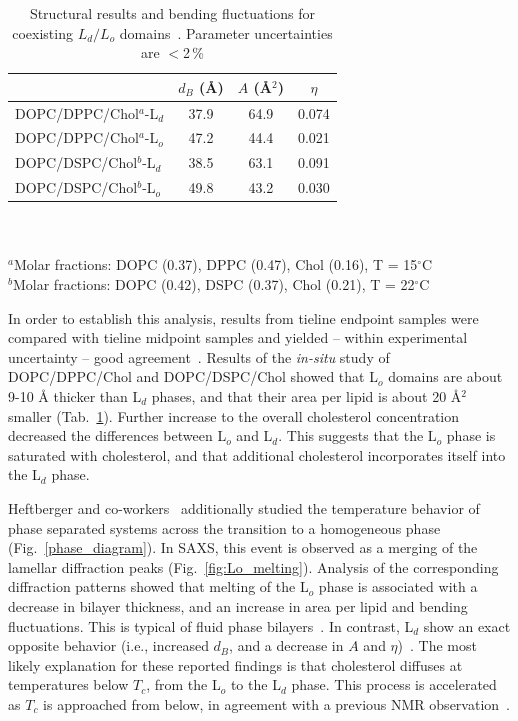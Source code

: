 \documentclass[8.5pt,twoside,twocolumn]{article}
\begin{document}
\begin{table} [b]
	\caption{Structural results and bending fluctuations for coexisting $L_d/L_o$ domains~\cite{Heftberger.2015}. Parameter uncertainties are $<$2\,\%}
	\begin{tabular}{lccc}\hline
		 & $d_B$ (\AA) & $A$ (\AA$^2$) & $\eta$ \\
		\hline
		DOPC/DPPC/Chol$^a$-L$_d$ &	37.9 & 64.9	& 0.074 \\
		DOPC/DPPC/Chol$^a$-L$_o$ &	47.2 & 44.4	& 0.021 \\
		DOPC/DSPC/Chol$^b$-L$_d$ &	38.5 & 63.1	& 0.091 \\
		DOPC/DSPC/Chol$^b$-L$_o$ &	49.8 & 43.2	& 0.030 \\
	\end{tabular}
	\label{tab:results_Ld-Lo}
	\\ \\
	{\footnotesize $^a$Molar fractions: DOPC (0.37), DPPC (0.47), Chol (0.16), T = 15$^\circ$C \\
		$^b$Molar fractions: DOPC (0.42), DSPC (0.37), Chol (0.21), T = 22$^\circ$C}
\end{table}

In order to establish this analysis, results from tieline endpoint samples were compared with tieline midpoint samples and yielded -- within experimental uncertainty -- good agreement~\cite{Heftberger.2015}. Results of the \textit{in-situ} study of DOPC/DPPC/Chol and DOPC/DSPC/Chol showed that L$_o$ domains are about 9-10 \AA\/ thicker than L$_d$ phases, and that their area per lipid is about 20 \AA$^2$ smaller (Tab.~\ref{tab:results_Ld-Lo}). Further increase to the overall cholesterol concentration decreased the differences between L$_o$ and L$_d$. This suggests that the L$_o$ phase is saturated with cholesterol, and that additional cholesterol incorporates itself into the L$_d$ phase.

Heftberger and co-workers~\cite{Heftberger.2015} additionally studied the temperature behavior of phase separated systems across the transition to a homogeneous phase (Fig.~\ref{phase_diagram}). In SAXS, this event is observed as a merging of the lamellar diffraction peaks (Fig.~\ref{fig:Lo_melting}). Analysis of the corresponding diffraction patterns showed that melting of the L$_o$ phase is associated with a decrease in bilayer thickness, and an increase in area per lipid and bending fluctuations. This is typical of fluid phase bilayers~\cite{Pabst.2004,Kucerka.2011}. In contrast, L$_d$  show an exact opposite behavior (i.e., increased $d_B$, and a decrease in $A$ and $\eta$)~\cite{Heftberger.2015}. The most likely explanation for these reported findings is that cholesterol diffuses at temperatures below $T_c$, from the L$_o$ to the L$_d$ phase. This process is accelerated as $T_c$ is approached from below, in agreement with a previous NMR observation~\cite{Davis.2014}.
\end{document}
